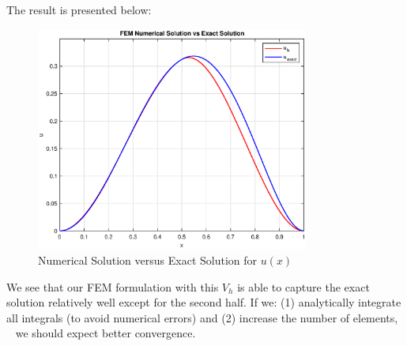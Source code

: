 \documentclass[12pt]{article} %
\begin{document}
The result is presented below:
\begin{figure}[h!]
\centering
 \includegraphics[width=0.8\textwidth]{p3_numerical.eps}
 \caption{Numerical Solution versus Exact Solution for $u(x)$}
\end{figure}

\newpage
We see that our FEM formulation with this $V_h$ is able to capture the exact solution relatively well except for the second half. If we: 
\newline
(1) analytically integrate all integrals (to avoid numerical errors) and
\newline
(2) increase the number of elements, 
\
\newline
we should expect better convergence.


\end{document}
